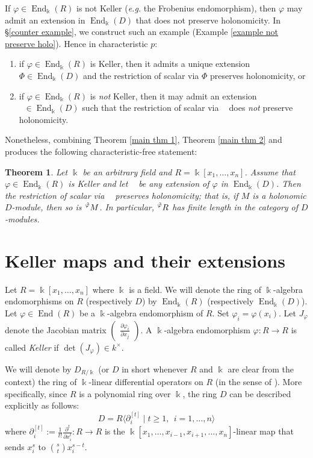 \documentclass[11pt]{amsart}
\newtheorem{theorem}{Theorem}[section]
\theoremstyle{definition}
\theoremstyle{remark}
\numberwithin{equation}{subsection}
\DeclareMathOperator{\kk}{\Bbbk}
\DeclareMathOperator{\tv}{\tilde{\varphi}}
\DeclareMathOperator{\End}{End}
\begin{document}
If $\varphi\in \End_{\kk}(R)$ is not Keller ({\it e.g.} the Frobenius endomorphism), then $\varphi$ may admit an extension in $\End_{\kk}(D)$ that does not preserve holonomicity. In \S\ref{counter example}, we construct such an example (Example \ref{example not preserve holo}). Hence in characteristic $p$:
\begin{enumerate}
\item if $\varphi\in \End_{\kk}(R)$ is Keller, then it admits a unique extension $\Phi\in \End_{\kk}(D)$ and the restriction of scalar via $\Phi$ preserves holonomicity, or
\item if $\varphi\in \End_{\kk}(R)$ is {\it not} Keller, then it may admit an extension $\tv\in \End_{\kk}(D)$ such that the restriction of scalar via $\tv$ does {\it not} preserve holonomicity.
\end{enumerate}


Nonetheless, combining Theorem \ref{main thm 1}, Theorem \ref{main thm 2} and \cite[Theorem 1.3]{BavulaAnnals} produces the following characteristic-free statement:
\begin{theorem}
Let $\kk$ be an arbitrary field and $R=\kk[x_1,\dots,x_n]$. Assume that $\varphi\in \End_{\kk}(R)$ is Keller and let $\tv$ be any extension of $\varphi$ in $\End_{\kk}(D)$. Then the restriction of scalar via $\tv$ preserves holonomicity; that is, if $M$ is a holonomic $D$-module, then so is $\prescript{\tv}{}M$. In particular, $\prescript{\tv}{}R$ has finite length in the category of $D$-modules.
\end{theorem}


\section{Keller maps and their extensions}
\label{sec: Keller}
Let $R=\kk[x_1,\dots,x_n]$ where $\kk$ is a field. We will denote the ring of $\kk$-algebra endomorphisms on $R$ (respectively $D$) by $\End_{\kk}(R)$ (respectively $\End_{\kk}(D)$). Let $\varphi\in \End(R)$ be a $\kk$-algebra endomorphism of $R$. Set $\varphi_i=\varphi(x_i)$. Let $J_{\varphi}$ denote the Jacobian matrix $\begin{pmatrix} \frac{\partial \varphi_i}{\partial x_j} \end{pmatrix}$. A $\kk$-algebra endomorphism $\varphi:R\to R$ is called \emph{Keller} if $\det(J_\varphi)\in k^{\times}$.

We will denote by $D_{R/\kk}$ (or $D$ in short whenever $R$ and $\kk$ are clear from the context) the ring of $\kk$-linear differential operators on $R$ (in the sense of \cite[\S16]{EGA4.4}). More specifically, since $R$ is a polynomial ring over $\kk$, the ring $D$ can be described explicitly as follows:
\[D=R\langle \partial^{[t]}_i\mid t\geq 1,\ \ i=1,\dots,n\rangle\]
where $\partial^{[t]}_i:=\frac{1}{t!}\frac{\partial^t}{\partial x^t_i}:R\to R$ is the $\kk[x_1,\dots,x_{i-1},x_{i+1},\dots,x_n]$-linear map that sends $x^s_i$ to $\binom{s}{t}x^{s-t}_i$. 
\end{document}
